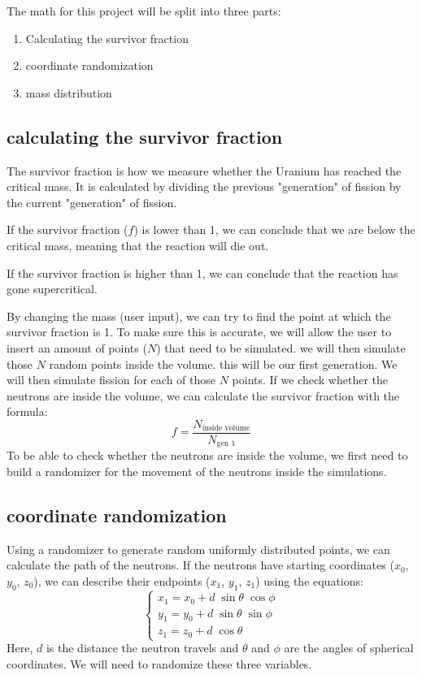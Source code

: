 The math for this project will be split into three parts:
\begin{enumerate}
	\item Calculating the survivor fraction
	\item coordinate randomization
	\item mass distribution 
\end{enumerate}
\subsection{calculating the survivor fraction}
The survivor fraction is how we measure whether the Uranium has reached the critical mass. It is calculated by dividing the previous "generation" of fission by the current "generation" of fission. 

If the survivor fraction ($f$) is lower than 1, we can conclude that we are below the critical mass, meaning that the reaction will die out.

If the survivor fraction is higher than 1, we can conclude that the reaction has gone supercritical.

By changing the mass (user input), we can try to find the point at which the survivor fraction is 1. To make sure this is accurate, we will allow the user to insert an amount of points ($N$) that need to be simulated. we will then simulate those $N$ random points inside the volume. this will be our first generation. We will then simulate fission for each of those $N$ points. If we check whether the neutrons are inside the volume, we can calculate the survivor fraction with the formula:
\begin{equation}
	f=\frac{N_{\text{inside volume}}}{N_{\text{gen 1}}}
\end{equation}
To be able to check whether the neutrons are inside the volume, we first need to build a randomizer for the movement of the neutrons inside the simulations.
\subsection{coordinate randomization}
Using a randomizer to generate random uniformly distributed points, we can calculate the path of the neutrons. If the neutrons have starting coordinates ($x_0$, $y_0$, $z_0$), we can describe their endpoints ($x_1$, $y_1$, $z_1$) using the equations:
\begin{displaymath}
	\begin{cases}
		x_1= x_0+d\;\sin\theta\;\cos\phi \\
		y_1=y_0+d\;\sin\theta\;\sin\phi \\
		z_1=z_0+d\;\cos\theta
	\end{cases}
\end{displaymath}
Here, $d$ is the distance the neutron travels and $\theta$ and $\phi$ are the angles of spherical coordinates. We will need to randomize these three variables.

